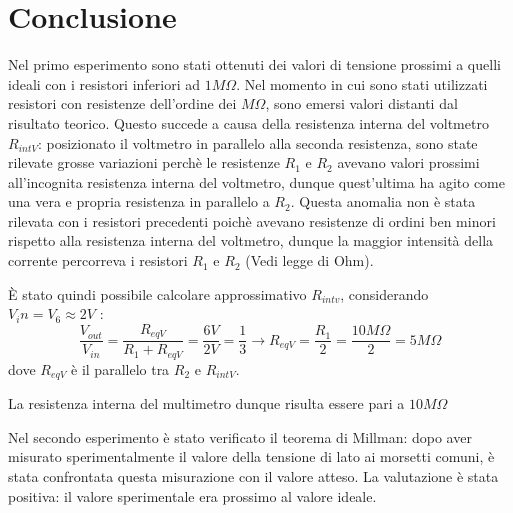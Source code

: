     \section{Conclusione}
    Nel primo esperimento sono stati ottenuti dei valori di tensione prossimi a quelli ideali con i resistori inferiori ad $1M\Omega$.
    Nel momento in cui sono stati utilizzati resistori con resistenze dell'ordine dei $M\Omega$, sono emersi valori distanti dal risultato teorico.
    Questo succede a causa della resistenza interna del voltmetro $R_{intV}$: posizionato il voltmetro in parallelo alla seconda resistenza, sono state rilevate grosse variazioni
    perchè le resistenze $R_1$ e $R_2$ avevano valori prossimi all'incognita resistenza interna del voltmetro, dunque quest'ultima ha agito come una vera e propria
    resistenza in parallelo a $R_2$. Questa anomalia non è stata rilevata con i resistori precedenti poichè avevano resistenze di ordini ben minori rispetto alla resistenza
    interna del voltmetro, dunque la maggior intensità della corrente percorreva i resistori $R_1$ e $R_2$ (Vedi legge di Ohm).\par
    È stato quindi possibile calcolare approssimativo $R_{intv}$, considerando $V_in = V_6 \approx 2V$ :
    \begin{equation}
        \frac{V_{out}}{V_{in}} = \frac{R_{eqV}}{R_1 + R_{eqV}} = \frac{6V}{2V} = \frac{1}{3} \longrightarrow R_{eqV} = \frac{R_1}{2} = \frac{10M\Omega}{2} = 5M\Omega
    \end{equation}
    dove $R_{eqV}$ è il parallelo tra $R_2$ e $R_{intV}$.\par
    La resistenza interna del multimetro dunque risulta essere pari a $10M\Omega$

    Nel secondo esperimento è stato verificato il teorema di Millman: dopo aver misurato sperimentalmente il valore della tensione di lato ai morsetti comuni,
    è stata confrontata questa misurazione con il valore atteso. La valutazione è stata positiva: il valore sperimentale era prossimo al valore ideale.

